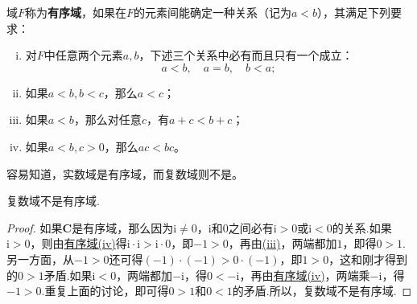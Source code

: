 \documentclass[../../main.tex]{subfiles}
\begin{document}
\begin{definition}[有序域]\label{definition:有序域}
域\(F\)称为\textbf{有序域}，如果在\(F\)的元素间能确定一种关系（记为\(a < b\)），其满足下列要求：
\begin{enumerate}[(i)]
\item\label{有序域:(i)} 对\(F\)中任意两个元素\(a,b\)，下述三个关系中必有而且只有一个成立：
\[
a < b, \quad a = b, \quad b < a;
\]

\item\label{有序域:(ii)} 如果\(a < b, b < c\)，那么\(a < c\)；

\item\label{有序域:(iii)} 如果\(a < b\)，那么对任意\(c\)，有\(a + c < b + c\)；

\item\label{有序域:(iv)} 如果\(a < b, c > 0\)，那么\(ac < bc\)。
\end{enumerate}
\end{definition}
\begin{note}
容易知道，实数域是有序域，而复数域则不是。
\end{note}

\begin{theorem}\label{theorem:复数域不是有序域}
复数域不是有序域.
\end{theorem}
\begin{proof}
如果\(\mathbf{C}\)是有序域，那么因为\(\mathrm{i} \neq 0\)，\(\mathrm{i}\)和\(0\)之间必有\(\mathrm{i} > 0\)或\(\mathrm{i} < 0\)的关系.如果\(\mathrm{i} > 0\)，则由\hyperref[definition:有序域]{有序域(iv)}得\(\mathrm{i} \cdot \mathrm{i} > \mathrm{i} \cdot 0\)，即\(-1 > 0\)，再由\hyperref[有序域:(iii)]{(iii)}，两端都加\(1\)，即得\(0 > 1\).另一方面，从\(-1 > 0\)还可得\((-1) \cdot (-1) > 0 \cdot (-1)\)，即\(1 > 0\)，这和刚才得到的\(0 > 1\)矛盾.如果\(\mathrm{i} < 0\)，两端都加\(-\mathrm{i}\)，得\(0 < -\mathrm{i}\)，再由\hyperref[definition:有序域]{有序域(iv)}，两端乘\(-\mathrm{i}\)，得\(-1 > 0\).重复上面的讨论，即可得\(0 > 1\)和\(0 < 1\)的矛盾.所以，复数域不是有序域. 

\end{proof}
\end{document}
